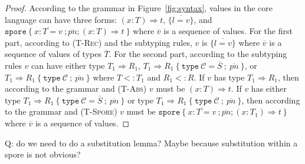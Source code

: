 \documentclass{llncs}
\newcommand{\seq}[1]{\overline{#1}}
\begin{document}
\begin{proof}
According to the grammar in Figure~\ref{fig:syntax}, values in the core language can have three forms: $(x: T) \Rightarrow t$, $\{ \seq{l = v} \}$, and $\texttt{spore}~\{~\seq{x : T = v}~; \seq{pn} ; (x: T) \Rightarrow t~\}$ where $\seq{v}$ is a sequence of values.
For the first part, according to (\textsc{T-Rec}) and the subtyping rules, $v$ is $\{ \seq{l = v} \}$ where $\seq{v}$ is a sequence of values of types $\seq{T}$.
For the second part, according to the subtyping rules $v$ can have either type $T_1 \Rightarrow R_1$, $T_1 \Rightarrow R_1~\{~\texttt{type}~\mathcal{C} = \seq{S}~;~\seq{pn}~\}$, or $T_1 \Rightarrow R_1~\{~\texttt{type}~\mathcal{C}~;~\seq{pn}~\}$ where $T <: T_1$ and $R_1 <: R$. If $v$ has type $T_1 \Rightarrow R_1$, then according to the grammar and (\textsc{T-Abs}) $v$ must be $(x: T) \Rightarrow t$. If $v$ has either type $T_1 \Rightarrow R_1~\{~\texttt{type}~\mathcal{C} = \seq{S}~;~\seq{pn}~\}$ or type $T_1 \Rightarrow R_1~\{~\texttt{type}~\mathcal{C}~;~\seq{pn}~\}$, then according to the grammar and (\textsc{T-Spore}) $v$ must be $\texttt{spore}~\{~\seq{x : T = v}~; \seq{pn} ; (x: T_1) \Rightarrow t~\}$ where $\seq{v}$ is a sequence of values.
\end{proof}

Q: do we need to do a substitution lemma? Maybe because substitution within a spore is not obvious?
\end{document}

